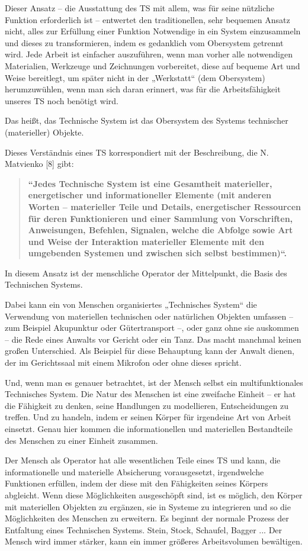 \documentclass[11pt,a4paper]{article}
\begin{document}
Dieser Ansatz -- die Ausstattung des TS mit allem, was für seine nützliche
Funktion erforderlich ist -- entwertet den traditionellen, sehr bequemen
Ansatz nicht, alles zur Erfüllung einer Funktion Notwendige in ein System
einzusammeln und dieses zu transformieren, indem es gedanklich vom Obersystem
getrennt wird. Jede Arbeit ist einfacher auszuführen, wenn man vorher alle
notwendigen Materialien, Werkzeuge und Zeichnungen vorbereitet, diese auf
bequeme Art und Weise bereitlegt, um später nicht in der „Werkstatt“ (dem
Obersystem) herumzuwühlen, wenn man sich daran erinnert, was für die
Arbeitsfähigkeit unseres TS noch benötigt wird.

Das heißt, das Technische System ist das Obersystem des Systems technischer
(materieller) Objekte.

Dieses Verständnis eines TS korrespondiert mit der Beschreibung, die
N. Matvienko [8] gibt: 
\begin{quote}\bf
  “Jedes Technische System ist eine Gesamtheit materieller, energetischer und
  informationeller Elemente (mit anderen Worten -- materieller Teile und
  Details, energetischer Ressourcen für deren Funktionieren und einer Sammlung
  von Vorschriften, Anweisungen, Befehlen, Signalen, welche die Abfolge sowie
  Art und Weise der Interaktion materieller Elemente mit den umgebenden
  Systemen und zwischen sich selbst bestimmen)“.
\end{quote}
In diesem Ansatz ist der menschliche Operator der Mittelpunkt, die Basis des
Technischen Systems.

Dabei kann ein von Menschen organisiertes „Technisches System“ die Verwendung
von materiellen technischen oder natürlichen Objekten umfassen -- zum Beispiel
Akupunktur oder Gütertransport --, oder ganz ohne sie auskommen -- die Rede
eines Anwalts vor Gericht oder ein Tanz. Das macht manchmal keinen großen
Unterschied.  Als Beispiel für diese Behauptung kann der Anwalt dienen, der im
Gerichtssaal mit einem Mikrofon oder ohne dieses spricht.

Und, wenn man es genauer betrachtet, ist der Mensch selbst ein
multifunktionales Technisches System. Die Natur des Menschen ist eine
zweifache Einheit -- er hat die Fähigkeit zu denken, seine Handlungen zu
modellieren, Entscheidungen zu treffen. Und zu handeln, indem er seinen Körper
für irgendeine Art von Arbeit einsetzt. Genau hier kommen die informationellen
und materiellen Bestandteile des Menschen zu einer Einheit zusammen.

Der Mensch als Operator hat alle wesentlichen Teile eines TS und kann, die
informationelle und materielle Absicherung vorausgesetzt, irgendwelche
Funktionen erfüllen, indem der diese mit den Fähigkeiten seines Körpers
abgleicht. Wenn diese Möglichkeiten ausgeschöpft sind, ist es möglich, den
Körper mit materiellen Objekten zu ergänzen, sie in Systeme zu integrieren und
so die Möglichkeiten des Menschen zu erweitern. Es beginnt der normale Prozess
der Entfaltung eines Technischen Systems.  Stein, Stock, Schaufel, Bagger ...
Der Mensch wird immer stärker, kann ein immer größeres Arbeitsvolumen
bewältigen.
\end{document}
